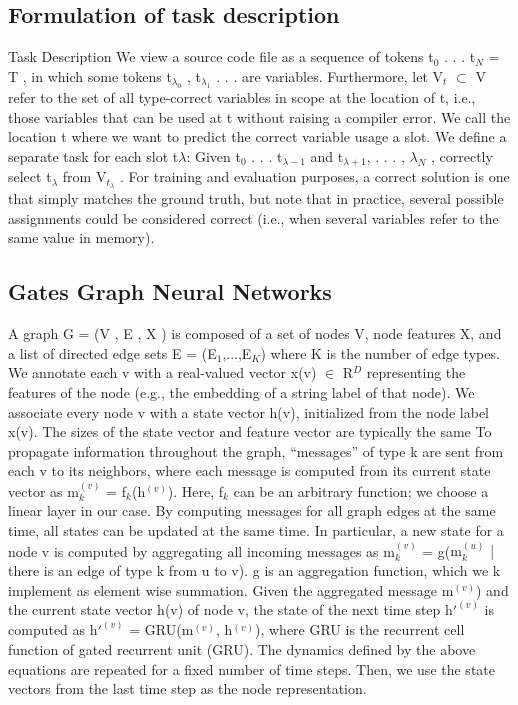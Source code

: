 \documentclass{article}
\begin{document}
\subsection{Formulation of task description}
Task Description We view a source code file as a sequence of tokens t$_0$ . . . t$_N$ = T , in which some tokens t$_{\lambda_0}$ , t$_{\lambda_1}$ . . . are variables. Furthermore, let V$_t$ $\subset$ V refer to the set of all type-correct variables in scope at the location of t, i.e., those variables that can be used at t without raising a compiler error. We call the location t where we want to predict the correct variable usage a slot. We define a separate task for each slot t$\lambda$: Given t$_0$ . . . t$_{\lambda-1}$ and t$_{\lambda+1}$, . . . , $\lambda_N$ , correctly select t$_\lambda$ from V$_{t_\lambda}$ . For training and evaluation purposes, a correct solution is one that simply matches the ground truth, but note that in practice, several possible assignments could be considered correct (i.e., when several variables refer to the same value in memory).

\subsection{Gates Graph Neural Networks}
A graph G = (V , E , X ) is composed of a set of nodes V, node features X, and a list of directed edge sets E = (E$_1$,...,E$_K$) where K is the number of edge types. We annotate each v with a real-valued vector x(v) $\in$ R$^D$ representing the features of the node (e.g., the embedding of a string label of that node). We associate every node v with a state vector h(v), initialized from the node label x(v). The sizes of the state vector and feature vector are typically the same To propagate information throughout the graph, “messages” of type k are sent from each v to its neighbors, where each message is computed from its current state vector as m$_k^{(v)}$ = f$_k$(h$^{(v)}$). Here, f$_k$ can be an arbitrary function; we choose a linear layer in our case. By computing messages for all graph edges at the same time, all states can be updated at the same time. In particular, a new state for a node v is computed by aggregating all incoming messages as m$_k^{(v)}$ = g({m$_k^{(u)}$ | there is an edge of type k from u to v}). g is an aggregation function, which we k implement as element wise summation. Given the aggregated message m$^{(v)}$) and the current state vector h(v) of node v, the state of the next time step h$'^{(v)}$ is computed as h$'^{(v)}$ = GRU(m$^{(v)}$, h$^{(v)}$), where GRU is the recurrent cell function of gated recurrent unit (GRU). The dynamics defined by the above equations are repeated for a fixed number of time steps. Then, we use the state vectors from the last time step as the node representation.
\end{document}
